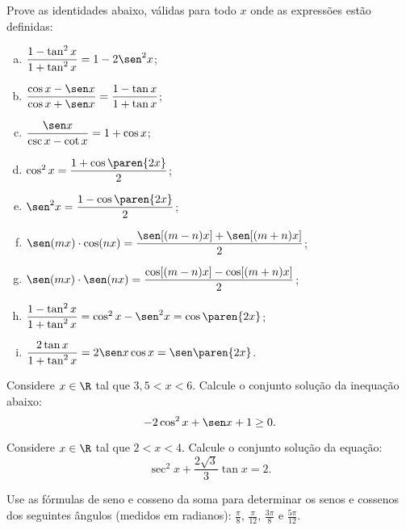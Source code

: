 \begin{exercise}
    Prove as identidades abaixo, válidas para todo $x$ onde as
expressões estão definidas:
\begin{enumerate}[a)]
  \item $\dfrac{1-\tan^2 x}{1+\tan^2 x} = 1 - 2\sen^2 x$;
  \item $\dfrac{\cos x - \sen x}{\cos x + \sen x} = \dfrac{1 - \tan x}{1+\tan
  x}$;
  \item $\dfrac{\sen x}{\csc x - \cot x} = 1+ \cos x$;
  \item $\cos^2 x = \dfrac {1+\cos \paren{2x}} 2$;
  \item $\sen^2 x = \dfrac {1-\cos \paren{2x}} 2$;
  \item $\sen(mx)\cdot\cos(nx)=\dfrac{\sen[(m-n)x]+\sen[(m+n)x]}{2}$;
  \item $\sen(mx)\cdot\sen(nx)=\dfrac{\cos[(m-n)x]-\cos[(m+n)x]}{2}$;
  \item $\dfrac{1-\tan^2 x}{1+\tan^2 x} = \cos^2 x - \sen^2 x = \cos \paren{2x}$;
  \item $\dfrac{2\tan x}{1+\tan^2 x} = 2\sen x \cos x= \sen\paren{2x}$.
\end{enumerate}
\end{exercise}

\begin{exercise}
    Considere $x \in \R$ tal que $3{,}5 < x < 6$.
    Calcule o conjunto solução da inequação abaixo:
     $$-2 \cos^2 x + \sen x + 1 \geq 0.$$
\end{exercise}

\begin{exercise}
    Considere $x \in \R$ tal que $2 < x < 4$.
    Calcule o conjunto solução da equação:
    $$\sec^2 x + \dfrac{2 \sqrt 3}{3} \tan x = 2.$$
\end{exercise}

\begin{exercise}
    Use as fórmulas de seno e cosseno da soma para determinar os
senos e cossenos dos seguintes ângulos (medidos em radianos): $\frac
{\pi} 8$, $\frac{\pi} {12}$, $\frac {3\pi} 8$ e $\frac{5\pi}{12}$.
\end{exercise}

